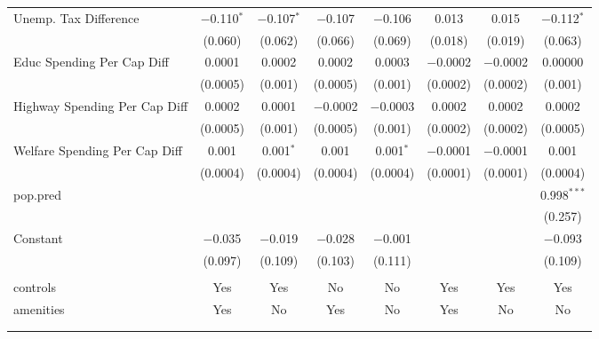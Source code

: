 \begin{table}[!htbp]
\begin{tabular}{@{\extracolsep{5pt}}lccccccc}
  Unemp. Tax Difference & $-$0.110$^{*}$ & $-$0.107$^{*}$ & $-$0.107 & $-$0.106 & 0.013 & 0.015 & $-$0.112$^{*}$ \\ 
  & (0.060) & (0.062) & (0.066) & (0.069) & (0.018) & (0.019) & (0.063) \\ 
  Educ Spending Per Cap Diff & 0.0001 & 0.0002 & 0.0002 & 0.0003 & $-$0.0002 & $-$0.0002 & 0.00000 \\ 
  & (0.0005) & (0.001) & (0.0005) & (0.001) & (0.0002) & (0.0002) & (0.001) \\ 
  Highway Spending Per Cap Diff & 0.0002 & 0.0001 & $-$0.0002 & $-$0.0003 & 0.0002 & 0.0002 & 0.0002 \\ 
  & (0.0005) & (0.001) & (0.0005) & (0.001) & (0.0002) & (0.0002) & (0.0005) \\ 
  Welfare Spending Per Cap Diff & 0.001 & 0.001$^{*}$ & 0.001 & 0.001$^{*}$ & $-$0.0001 & $-$0.0001 & 0.001 \\ 
  & (0.0004) & (0.0004) & (0.0004) & (0.0004) & (0.0001) & (0.0001) & (0.0004) \\ 
  pop.pred &  &  &  &  &  &  & 0.998$^{***}$ \\ 
  &  &  &  &  &  &  & (0.257) \\ 
  Constant & $-$0.035 & $-$0.019 & $-$0.028 & $-$0.001 &  &  & $-$0.093 \\ 
  & (0.097) & (0.109) & (0.103) & (0.111) &  &  & (0.109) \\ 
 \hline \\[-1.8ex] 
controls & Yes & Yes & No & No & Yes & Yes & Yes \\ 
amenities & Yes & No & Yes & No & Yes & No & No \\ 
\hline \\[-1.8ex] 
\hline 
\hline \\[-1.8ex] 
\end{tabular} 
\end{table} 
